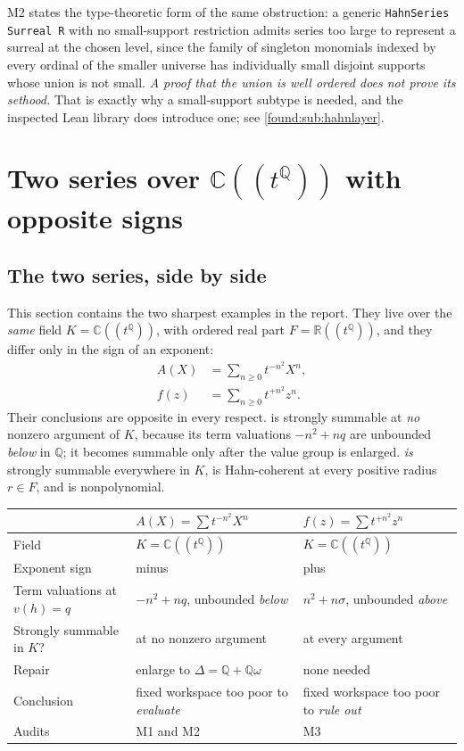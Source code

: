 \documentclass[11pt,letterpaper]{article}
\numberwithin{equation}{section}
\theoremstyle{definition}
\theoremstyle{remark}
\newcommand{\R}{\mathbb R}
\newcommand{\C}{\mathbb C}
\newcommand{\Q}{\mathbb Q}
\begin{document}
M2 states the type-theoretic form of the same obstruction: a generic
\texttt{HahnSeries Surreal R} with no small-support restriction admits series
too large to represent a surreal at the chosen level, since the family of
singleton monomials indexed by every ordinal of the smaller universe has
individually small disjoint supports whose union is not small. \emph{A proof
that the union is well ordered does not prove its sethood.} That is exactly why
a small-support subtype is needed, and the inspected Lean library does introduce
one; see \cref{found:sub:hahnlayer}.

\section{Two series over \texorpdfstring{$\C((t^\Q))$}{the field C((t\^{}Q))} with opposite signs}
\label{found:sec:twoseries}

\subsection{The two series, side by side}
\label{found:sub:sidebyside}
This section contains the two sharpest examples in the report. They live over
the \emph{same} field $K=\C((t^\Q))$, with ordered real part
$F=\R((t^\Q))$, and they differ only in the sign of an exponent:
\begin{align}
 A(X)&=\sum_{n\ge0}t^{\mathbf{-}n^2}X^n,
 \label{found:eq:minusseries}\\[0.3em]
 f(z)&=\sum_{n\ge0}t^{\mathbf{+}n^2}z^n.
 \label{found:eq:plusseries}
\end{align}
Their conclusions are opposite in every respect.
 is strongly summable at \emph{no} nonzero argument
of $K$, because its term valuations $-n^2+nq$ are unbounded \emph{below} in
$\Q$; it becomes summable only after the value group is enlarged.
 \emph{is} strongly summable everywhere in $K$, is
Hahn-coherent at every positive radius $r\in F$, and is nonpolynomial.

\begin{center}\small
\begin{tabular}{@{}P{0.20\textwidth}P{0.34\textwidth}P{0.37\textwidth}@{}}
\toprule
 & $A(X)=\sum t^{-n^2}X^n$ & $f(z)=\sum t^{+n^2}z^n$\\
\midrule
Field & $K=\C((t^\Q))$ & $K=\C((t^\Q))$\\
Exponent sign & minus & plus\\
Term valuations at $v(h)=q$ & $-n^2+nq$, unbounded \emph{below} & $n^2+n\sigma$, unbounded \emph{above}\\
Strongly summable in $K$? & at no nonzero argument & at every argument\\
Repair & enlarge to $\Delta=\Q+\Q\omega$ & none needed\\
Conclusion & fixed workspace too poor to \emph{evaluate} & fixed workspace too poor to \emph{rule out}\\
Audits & M1 and M2 & M3\\
\bottomrule
\end{tabular}
\end{center}
\end{document}

